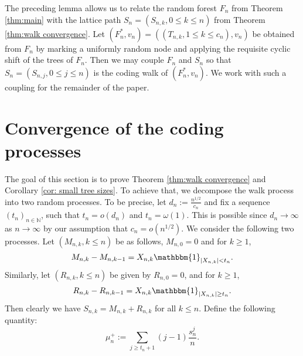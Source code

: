 The preceding lemma allows us to relate the random forest $F_n$ from Theorem \ref{thm:main} with the lattice path $S_n=(S_{n,k},0 \le k \le n)$ from Theorem \ref{thm:walk convergence}. Let $(F_n^*,v_n)=((T_{n,k},1 \le k \le c_n),v_n)$ be obtained from $F_n$ by marking a uniformly random node and applying the requisite cyclic shift of the trees of $F_n$. Then we may couple $F_n$ and $S_n$ so that $S_n = (S_{n,j},0 \le j \le n)$ is the coding walk of $(F_n^*,v_n)$. We work with such a coupling for the remainder of the paper. 


\section{\bf Convergence of the coding processes}\label{sec:convergence of the processes}
The goal of this section is to prove Theorem \ref{thm:walk convergence} and Corollary \ref{cor: small tree sizes}. To achieve that, we decompose the walk process into two random processes. To be precise, let $d_n:=\frac{n^{1/2}}{c_n}$ and fix a sequence $(t_n)_{n\in\mathbb{N}}$, such that $t_n=o(d_n)$ and $t_n=\omega(1)$. This is possible since $d_n\to\infty$ as $n\to\infty$ by our assumption that $c_n=o(n^{1/2})$. We consider the following two processes. Let $(M_{n,k}, k\le n)$ be as follows, $M_{n,0}=0$ and for $k\ge 1$, \[M_{n,k}-M_{n, k-1}=X_{n,k}\mathbbm{1}_{|X_{n,k}|<t_n}.\] Similarly, let $(R_{n,k}, k\le n)$ be given by $R_{n,0}=0$, and for $k\ge 1$, \[R_{n,k}-R_{n, k-1}=X_{n,k}\mathbbm{1}_{|X_{n,k}|\ge t_n}.\] Then clearly we have $S_{n,k}=M_{n,k}+R_{n,k}$ for all $k\le n$. Define the following quantity: \[\mu^+_n:=\sum\limits_{j\ge t_n+1}(j-1) \frac{s^j_n}{n}.\]

